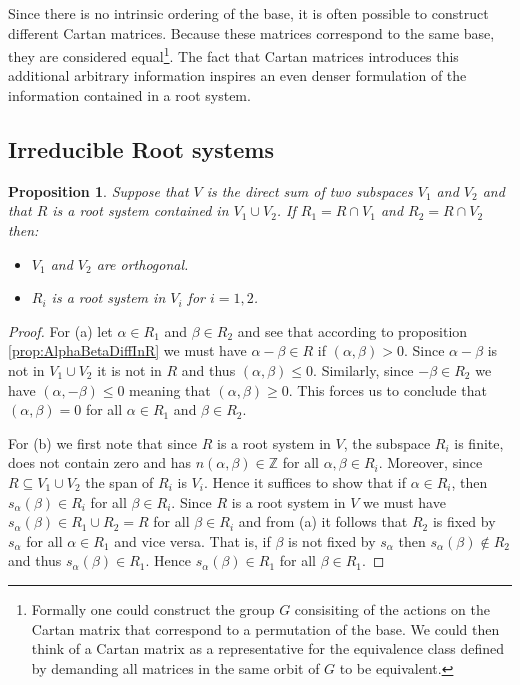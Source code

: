 \documentclass[twoside,utf8]{article}
\theoremstyle{plain}
\newtheorem{proposition}{Proposition}
\theoremstyle{definition}
\theoremstyle{remark}
\begin{document}
\noindent
Since there is no intrinsic ordering of the base, it is often possible to construct different Cartan matrices. Because these matrices correspond to the same base, they are considered equal\footnote{Formally one could construct the group $G$ consisiting of the actions on the Cartan matrix that correspond to a permutation of the base. We could then think of a Cartan matrix as a representative for the equivalence class defined by demanding all matrices in the same orbit of $G$ to be equivalent. }. The fact that Cartan matrices introduces this additional arbitrary information inspires an even denser formulation of the information contained in a root system.  



\subsection{Irreducible Root systems}


\begin{proposition}
Suppose that $V$ is the direct sum of two subspaces $V_1$ and $V_2$ and that $R$ is a root system contained in $V_1\cup V_2$. If $R_1 = R\cap V_1$ and $R_2=R\cap V_2$ then:
\begin{itemize}
\item[(a)] $V_1$ and $V_2$ are orthogonal. 
\item[(b)] $R_i$ is a root system in $V_i$ for $i=1,2$.
\end{itemize}
\end{proposition}
\begin{proof}
For (a) let $\alpha \in R_1$ and $\beta \in R_2$ and see that according to proposition \ref*{prop:AlphaBetaDiffInR} we must have $\alpha-\beta\in R$ if $(\alpha,\beta)>0$. Since $\alpha-\beta$ is not in $V_1\cup V_2$ it is not in $R$ and thus $(\alpha,\beta)\leq 0$. Similarly, since $-\beta \in R_2$ we have $(\alpha,-\beta)\leq 0$ meaning that $(\alpha,\beta) \geq 0$. This forces us to conclude that $(\alpha,\beta)=0$ for all $\alpha \in R_1$ and $\beta \in R_2$.

For (b) we first note that since $R$ is a root system in $V$, the subspace $R_i$ is finite, does not contain zero and has $n(\alpha,\beta)\in \mathbb{Z}$ for all $\alpha,\beta \in R_i$. Moreover, since $R\subseteq V_1 \cup V_2$ the span of $R_i$ is $V_i$. Hence it suffices to show that if $\alpha \in R_i$, then $s_\alpha(\beta)\in R_i$ for all $\beta \in R_i$. Since $R$ is a root system in $V$ we must have $s_\alpha(\beta)\in R_1 \cup R_2 = R$ for all $\beta \in R_i$ and from (a) it follows that $R_2$ is fixed by $s_\alpha$ for all $\alpha \in R_1$ and vice versa. That is, if $\beta$ is not fixed by $s_\alpha$ then $s_\alpha(\beta) \notin R_2$ and thus $s_\alpha(\beta)\in R_1$. Hence $s_\alpha(\beta)\in R_1$ for all $\beta \in R_1$.
\end{proof}
\end{document}
